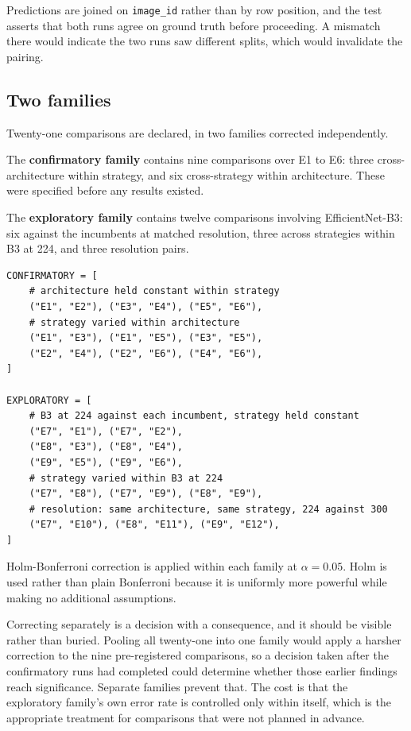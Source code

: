 Predictions are joined on \texttt{image\_id} rather than by row position, and the test
asserts that both runs agree on ground truth before proceeding. A mismatch there would
indicate the two runs saw different splits, which would invalidate the pairing.

\subsection{Two families}
\label{sec:stat-families}

Twenty-one comparisons are declared, in two families corrected independently.

The \textbf{confirmatory family} contains nine comparisons over E1 to E6: three
cross-architecture within strategy, and six cross-strategy within architecture. These
were specified before any results existed.

The \textbf{exploratory family} contains twelve comparisons involving EfficientNet-B3:
six against the incumbents at matched resolution, three across strategies within B3 at
224, and three resolution pairs.

\begin{lstlisting}[caption={The two declared families, \texttt{scripts/statistical\_tests.py}.},
                   label={lst:families}]
CONFIRMATORY = [
    # architecture held constant within strategy
    ("E1", "E2"), ("E3", "E4"), ("E5", "E6"),
    # strategy varied within architecture
    ("E1", "E3"), ("E1", "E5"), ("E3", "E5"),
    ("E2", "E4"), ("E2", "E6"), ("E4", "E6"),
]

EXPLORATORY = [
    # B3 at 224 against each incumbent, strategy held constant
    ("E7", "E1"), ("E7", "E2"),
    ("E8", "E3"), ("E8", "E4"),
    ("E9", "E5"), ("E9", "E6"),
    # strategy varied within B3 at 224
    ("E7", "E8"), ("E7", "E9"), ("E8", "E9"),
    # resolution: same architecture, same strategy, 224 against 300
    ("E7", "E10"), ("E8", "E11"), ("E9", "E12"),
]
\end{lstlisting}

Holm-Bonferroni correction is applied within each family at $\alpha = 0.05$. Holm is
used rather than plain Bonferroni because it is uniformly more powerful while making no
additional assumptions.

Correcting separately is a decision with a consequence, and it should be visible rather
than buried. Pooling all twenty-one into one family would apply a harsher correction to
the nine pre-registered comparisons, so a decision taken after the confirmatory runs had
completed could determine whether those earlier findings reach significance. Separate
families prevent that. The cost is that the exploratory family's own error rate is
controlled only within itself, which is the appropriate treatment for comparisons that
were not planned in advance.


